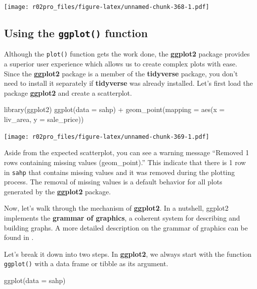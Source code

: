\documentclass[
]{book}
\newenvironment{Shaded}{\begin{snugshade}}{\end{snugshade}}
\newcommand{\AttributeTok}[1]{\textcolor[rgb]{0.77,0.63,0.00}{#1}}
\newcommand{\FunctionTok}[1]{\textcolor[rgb]{0.00,0.00,0.00}{#1}}
\newcommand{\NormalTok}[1]{#1}
\newcommand{\SpecialCharTok}[1]{\textcolor[rgb]{0.00,0.00,0.00}{#1}}
\begin{document}
\texttt{[image: r02pro\_files/figure-latex/unnamed-chunk-368-1.pdf]}

\hypertarget{point}{%
\subsection{\texorpdfstring{Using the \texttt{ggplot()} function}{Using the ggplot() function}}\label{point}}

Although the \texttt{plot()} function gets the work done, the \textbf{ggplot2} package provides a superior user experience which allows us to create complex plots with ease. Since the \textbf{ggplot2} package is a member of the \textbf{tidyverse} package, you don't need to install it separately if \textbf{tidyverse} was already installed. Let's first load the package \textbf{ggplot2} and create a scatterplot.

\begin{Shaded}
\begin{Highlighting}[]
\FunctionTok{library}\NormalTok{(ggplot2)}
\FunctionTok{ggplot}\NormalTok{(}\AttributeTok{data =}\NormalTok{ sahp) }\SpecialCharTok{+} \FunctionTok{geom\_point}\NormalTok{(}\AttributeTok{mapping =} \FunctionTok{aes}\NormalTok{(}\AttributeTok{x =}\NormalTok{ liv\_area, }\AttributeTok{y =}\NormalTok{ sale\_price))}
\end{Highlighting}
\end{Shaded}

\texttt{[image: r02pro\_files/figure-latex/unnamed-chunk-369-1.pdf]}

Aside from the expected scatterplot, you can see a warning message ``Removed 1 rows containing missing values (geom\_point).'' This indicate that there is 1 row in \texttt{sahp} that contains missing values and it was removed during the plotting process. The removal of missing values is a default behavior for all plots generated by the \textbf{ggplot2} package.

Now, let's walk through the mechanism of \textbf{ggplot2}. In a nutshell, ggplot2 implements the \textbf{grammar of graphics}, a coherent system for describing and building graphs. A more detailed description on the grammar of graphics can be found in \citet{wickham2010layered}.

Let's break it down into two steps. In \textbf{ggplot2}, we always start with the function \texttt{ggplot()} with a data frame or tibble as its argument.

\begin{Shaded}
\begin{Highlighting}[]
\FunctionTok{ggplot}\NormalTok{(}\AttributeTok{data =}\NormalTok{ sahp)}
\end{Highlighting}
\end{Shaded}
\end{document}
